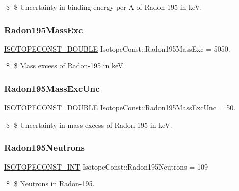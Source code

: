\$ \$ Uncertainty in binding energy per A of Radon-\/195 in keV. \mbox{\label{group___isotope_const-_radon-_rn195_ga9bdc03f63d10a26d6aa54606208db426}} 
\subsubsection{\texorpdfstring{Radon195\+Mass\+Exc}{Radon195MassExc}}
{\footnotesize\ttfamily \mbox{\hyperlink{group___isotope_const-_macros_ga8f45a7272ce02c0b4c65c44636ed719a}{I\+S\+O\+T\+O\+P\+E\+C\+O\+N\+S\+T\+\_\+\+D\+O\+U\+B\+LE}} Isotope\+Const\+::\+Radon195\+Mass\+Exc = 5050.}

\$ \$ Mass excess of Radon-\/195 in keV. \mbox{\label{group___isotope_const-_radon-_rn195_ga3ab5fec0342506feba1e9a6101731c0d}} 
\subsubsection{\texorpdfstring{Radon195\+Mass\+Exc\+Unc}{Radon195MassExcUnc}}
{\footnotesize\ttfamily \mbox{\hyperlink{group___isotope_const-_macros_ga8f45a7272ce02c0b4c65c44636ed719a}{I\+S\+O\+T\+O\+P\+E\+C\+O\+N\+S\+T\+\_\+\+D\+O\+U\+B\+LE}} Isotope\+Const\+::\+Radon195\+Mass\+Exc\+Unc = 50.}

\$ \$ Uncertainty in mass excess of Radon-\/195 in keV. \mbox{\label{group___isotope_const-_radon-_rn195_gad904c7c2ac9d9819dbfb0aff98ba9b4e}} 
\subsubsection{\texorpdfstring{Radon195\+Neutrons}{Radon195Neutrons}}
{\footnotesize\ttfamily \mbox{\hyperlink{group___isotope_const-_macros_ga5f18360b3e99483a35c32d789e62621c}{I\+S\+O\+T\+O\+P\+E\+C\+O\+N\+S\+T\+\_\+\+I\+NT}} Isotope\+Const\+::\+Radon195\+Neutrons = 109}

\$ \$ Neutrons in Radon-\/195. \mbox{\label{group___isotope_const-_radon-_rn195_ga20772dc8e435f9ef2fe6b9ca7c9d9b3a}} 

